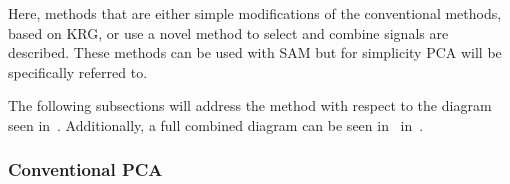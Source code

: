             Here, methods that are either simple modifications of the conventional methods, based on \gls{KRG}, or use a novel method to select and combine signals are described. These methods can be used with \gls{SAM} but for simplicity \gls{PCA} will be specifically referred to.
            
            The following subsections will address the method with respect to the diagram seen in~. Additionally, a full combined diagram can be seen in~ in~.

            \subsubsection{Conventional PCA} \label{sec:pca_data_driven_surrogate_signal_extraction_methods_for_dynamic_pet_methods_conventional_pca}
